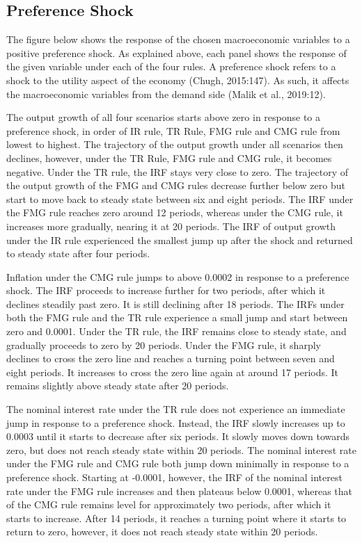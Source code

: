 \documentclass[11pt,preprint, authoryear]{elsarticle}
\numberwithin{equation}{section}
\numberwithin{figure}{section}
\numberwithin{table}{section}
\begin{document}
\hypertarget{preference-shock}{%
\subsection{Preference Shock}\label{preference-shock}}

The figure below shows the response of the chosen macroeconomic
variables to a positive preference shock. As explained above, each panel
shows the response of the given variable under each of the four rules. A
preference shock refers to a shock to the utility aspect of the economy
(Chugh, 2015:147). As such, it affects the macroeconomic variables from
the demand side (Malik et al., 2019:12).

The output growth of all four scenarios starts above zero in response to
a preference shock, in order of IR rule, TR Rule, FMG rule and CMG rule
from lowest to highest. The trajectory of the output growth under all
scenarios then declines, however, under the TR Rule, FMG rule and CMG
rule, it becomes negative. Under the TR rule, the IRF stays very close
to zero. The trajectory of the output growth of the FMG and CMG rules
decrease further below zero but start to move back to steady state
between six and eight periods. The IRF under the FMG rule reaches zero
around 12 periods, whereas under the CMG rule, it increases more
gradually, nearing it at 20 periods. The IRF of output growth under the
IR rule experienced the smallest jump up after the shock and returned to
steady state after four periods.

Inflation under the CMG rule jumps to above 0.0002 in response to a
preference shock. The IRF proceeds to increase further for two periods,
after which it declines steadily past zero. It is still declining after
18 periods. The IRFs under both the FMG rule and the TR rule experience
a small jump and start between zero and 0.0001. Under the TR rule, the
IRF remains close to steady state, and gradually proceeds to zero by 20
periods. Under the FMG rule, it sharply declines to cross the zero line
and reaches a turning point between seven and eight periods. It
increases to cross the zero line again at around 17 periods. It remains
slightly above steady state after 20 periods.

The nominal interest rate under the TR rule does not experience an
immediate jump in response to a preference shock. Instead, the IRF
slowly increases up to 0.0003 until it starts to decrease after six
periods. It slowly moves down towards zero, but does not reach steady
state within 20 periods. The nominal interest rate under the FMG rule
and CMG rule both jump down minimally in response to a preference shock.
Starting at -0.0001, however, the IRF of the nominal interest rate under
the FMG rule increases and then plateaus below 0.0001, whereas that of
the CMG rule remains level for approximately two periods, after which it
starts to increase. After 14 periods, it reaches a turning point where
it starts to return to zero, however, it does not reach steady state
within 20 periods.
\end{document}
